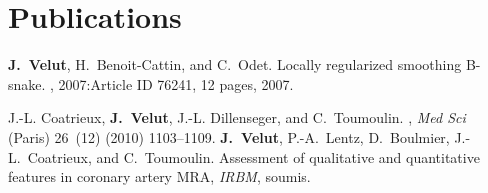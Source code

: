 %
\pagebreak
\section{Publications}
\label{sec:publications}
%
\small
\newcommand{\myitemsep}{0mm}
%
\renewcommand{\refname}{\normalsize{Journaux internationaux}}
\begin{thebibliography}{1}
\setlength{\itemsep}{\myitemsep}
%
\textbf{J.~Velut}, H.~Benoit-Cattin, and C.~Odet.
\newblock Locally regularized smoothing B-snake.
,
2007:Article ID 76241, 12 pages, 2007.
%
\end{thebibliography}
%
\renewcommand{\refname}{\normalsize{Journaux nationaux}}
\vspace{-10pt}
\begin{thebibliography}{1}
\setlength{\itemsep}{\myitemsep}
%
J.-L. Coatrieux, \textbf{J.~Velut}, J.-L. Dillenseger, and C.~Toumoulin.
,
\newblock \emph{Med Sci} (Paris) 26~(12) (2010) 1103--1109.
%
\textbf{J.~Velut}, P.-A.~Lentz, D.~Boulmier, J.-L.~Coatrieux, and C.~Toumoulin.
\newblock Assessment of qualitative and quantitative features in coronary artery
MRA,
\newblock \emph{IRBM}, soumis. 
\end{thebibliography}
%
\renewcommand{\refname}{\normalsize{Conf\'erences internationales avec
		    comit\'e de lecture }}
\vspace{-10pt}
